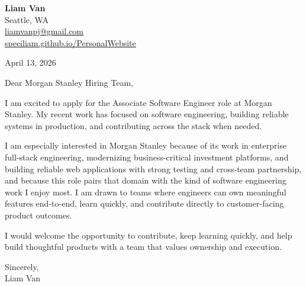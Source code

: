 \documentclass[letterpaper,11pt]{article}
\begin{document}
\begin{flushleft}
\textbf{\Large Liam Van} \\
Seattle, WA \\
\href{mailto:liamvanpj@gmail.com}{liamvanpj@gmail.com} \\
\href{https://speciliam.github.io/PersonalWebsite}{speciliam.github.io/PersonalWebsite}
\end{flushleft}

April 13, 2026

\noindent Dear Morgan Stanley Hiring Team,

\noindent I am excited to apply for the Associate Software Engineer role at Morgan Stanley. My recent work has focused on software engineering, building reliable systems in production, and contributing across the stack when needed.

\noindent I am especially interested in Morgan Stanley because of its work in enterprise full-stack engineering, modernizing business-critical investment platforms, and building reliable web applications with strong testing and cross-team partnership, and because this role pairs that domain with the kind of software engineering work I enjoy most. I am drawn to teams where engineers can own meaningful features end-to-end, learn quickly, and contribute directly to customer-facing product outcomes.

\noindent I would welcome the opportunity to contribute, keep learning quickly, and help build thoughtful products with a team that values ownership and execution.

\noindent Sincerely, \\
Liam Van
\end{document}
